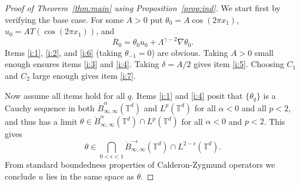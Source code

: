 \documentclass[12pt,reqno,letterpaper]{amsart}
\numberwithin{equation}{section}
\newcommand{\1}{{\bf 1}}
\newcommand{\2}{{\bf 2}}
\newcommand{\T}{\mathbb T}
\theoremstyle{remark}
\theoremstyle{remark}
\begin{document}
\begin{proof}[Proof of Theorem~\ref{thm:main} using Proposition~\ref{prop:ind}]
We start first by verifying the base case. For some $A > 0$ put $\theta_0 = A\cos(2\pi x_1)$, $u_0 = AT(\cos(2\pi x_1))$, and
$$
R_0 = \theta_0 u_0 + \Lambda^{\gamma - 2} \nabla \theta_0.
$$
Items \ref{i:1}, \ref{i:2}, and \ref{i:6} (taking $\theta_{-1} = 0$) are obvious. Taking $A > 0$ small enough ensures items \ref{i:3} and \ref{i:4}. Taking $\delta = A/2$ gives item \ref{i:5}. Choosing $C_1$ and $C_2$ large enough gives item \ref{i:7}.

Now assume all items hold for all $q$. Items \ref{i:1} and \ref{i:4} posit that $\{\theta_q\}$ is a Cauchy sequence in both $\dot{B}^\alpha_{\infty,\infty}(\T^d)$ and $L^p(\T^d)$ for all $\alpha < 0$ and all $p < 2$, and thus has a limit $\theta \in \dot{B}^\alpha_{\infty,\infty}(\T^d) \cap L^p(\T^d)$ for all $\alpha < 0$ and $p < 2$. This gives
$$
\theta \in \bigcap_{0 < \epsilon < 1} \dot{B}^{-\epsilon}_{\infty,\infty}(\T^d) \cap L^{2-\epsilon}(\T^d).
$$
From standard boundedness properties of Calderon-Zygmund operators we conclude $u$ lies in the same space as $\theta$.


\end{proof}
\end{document}
